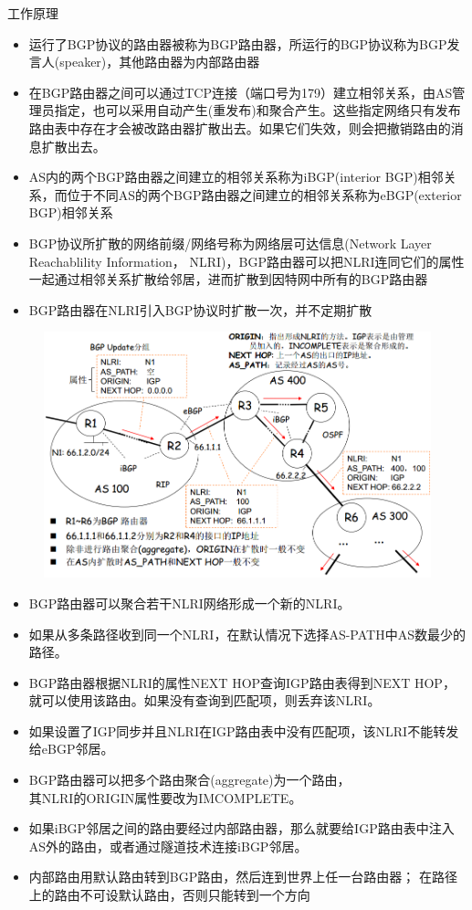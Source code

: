 \myhline
工作原理
\begin{itemize}
\item 运行了BGP协议的路由器被称为BGP路由器，所运行的BGP协议称为BGP发言人(speaker)，其他路由器为内部路由器
\item 在BGP路由器之间可以通过TCP连接（端口号为179）建立相邻关系，由AS管理员指定，也可以采用自动产生(重发布)和聚合产生。这些指定网络只有发布路由表中存在才会被改路由器扩散出去。如果它们失效，则会把撤销路由的消息扩散出去。
\item AS内的两个BGP路由器之间建立的相邻关系称为iBGP(interior BGP)相邻关系，而位于不同AS的两个BGP路由器之间建立的相邻关系称为eBGP(exterior BGP)相邻关系
\item  BGP协议所扩散的网络前缀/网络号称为网络层可达信息(Network Layer Reachablility Information， NLRI)，BGP路由器可以把NLRI连同它们的属性一起通过相邻关系扩散给邻居，进而扩散到因特网中所有的BGP路由器
\item BGP路由器在NLRI引入BGP协议时扩散一次，并不定期扩散
\end{itemize}
\begin{figure}[H]
	\centering
	\includegraphics[width=0.8\linewidth]{fig/NLRI.png}
\end{figure}

\begin{itemize}
\item BGP路由器可以聚合若干NLRI网络形成一个新的NLRI。
\item 如果从多条路径收到同一个NLRI，在默认情况下选择AS-PATH中AS数最少的路径。
\item BGP路由器根据NLRI的属性NEXT HOP查询IGP路由表得到NEXT HOP， 就可以使用该路由。如果没有查询到匹配项，则丢弃该NLRI。
\item 如果设置了IGP同步并且NLRI在IGP路由表中没有匹配项，该NLRI不能转发给eBGP邻居。
\item BGP路由器可以把多个路由聚合(aggregate)为一个路由，\\其NLRI的ORIGIN属性要改为IMCOMPLETE。
\item 如果iBGP邻居之间的路由要经过内部路由器，那么就要给IGP路由表中注入AS外的路由，或者通过隧道技术连接iBGP邻居。
\item 内部路由用默认路由转到BGP路由，然后连到世界上任一台路由器；
在路径上的路由不可设默认路由，否则只能转到一个方向
\end{itemize}


